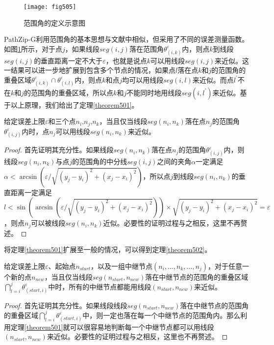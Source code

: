 \begin{figure}[h]
\centering
\texttt{[image: fig505]}
\caption{范围角的定义示意图}
\label{fig:505}
\end{figure}
PathZip-G利用范围角的基本思想与文献中相似，但采用了不同的误差测量函数。如图\ref{fig:505}所示，对于点$j$，如果线段$seg(i,j)$落在范围角$\theta_{(i,k)}^{\varepsilon}$内，则点$k$到线段$seg(i,j)$的垂直距离一定不大于$\varepsilon$，也就是说点$k$可以用线段$seg(i,j)$来近似。这一结果可以进一步地扩展到包含多个节点的情况，如果点$l$落在点$k$和$j$的范围角的重叠区域$\theta_{(i,k)}^{\varepsilon}\cap{\theta_{(i,l)}^{\varepsilon}}$内，则点$k$和点$j$均可以用线段$seg(i,l)$来近似。而点$l^{'}$不在$k$和$j$的范围角的重叠区域，所以点$k$和$j$不能同时地用线段$seg(i,l^{'})$来近似。基于以上原理，我们给出了定理\ref{theorem501}。
\begin{theorem}
  \label{theorem501}
给定误差上限$\varepsilon$和三个点$n_i$,$n_j$,$n_k$，当且仅当线段$seg(n_i,n_k)$落在点$n_j$的范围角$\theta_{(i,j)}^{\varepsilon}$内时，点$n_j$可以用线段$seg(n_i,n_k)$来近似。
\end{theorem}
\begin{proof}
首先证明其充分性。如果线段$seg(n_i,n_k)$落在点$n_j$的范围角$\theta_{(i,j)}^{\varepsilon}$内，则线段$seg(n_i,n_k)$与点$j$的范围角的中分线$seg(i,j)$之间的夹角$\alpha$一定满足$\alpha<\arcsin(\varepsilon/\sqrt{(y_j-y_i)^2+(x_j-x_i)^2})$，所以点$j$到线段$seg(n_i,n_k)$的垂直距离一定满足$l<\sin{(\arcsin(\varepsilon/\sqrt{(y_j-y_i)^2+(x_j-x_i)^2}))}\times\sqrt{(y_j-y_i)^2+(x_j-x_i)^2}=\varepsilon$，则点$n_j$可以被线段$seg(n_i,n_k)$近似。必要性的证明过程与之相反，这里不再赘述。
\end{proof}

将定理\ref{theorem501}扩展至一般的情况，可以得到定理\ref{theorem502}。
\begin{theorem}
  \label{theorem502}
给定误差上限$\varepsilon$、起始点$n_{start}$，以及一组中继节点$(n_i,\ldots,n_k,\ldots,n_j)$，对于任意一个新的点$n_{new}$，当且仅当线段$seg(n_{start},n_{new})$落在中继节点的范围角的重叠区域$\bigcap_{l=i}^{j}\theta_{(start,i)}^{\varepsilon}$中时，所有的中继节点都能用线段$(n_{start},n_{new})$来近似。
\end{theorem}
\begin{proof}
首先证明其充分性。如果线段线段$seg(n_{start},n_{new})$落在中继节点的范围角的重叠区域$\bigcap_{l=i}^{j}\theta_{(start,i)}^{\varepsilon}$中，则一定也落在每一个中继节点的范围角内。那么利用定理\ref{theorem501}就可以很容易地判断每一个中继节点都可以用线段$(n_{start},n_{new})$来近似。必要性的证明过程与之相反，这里也不再赘述。
\end{proof}

